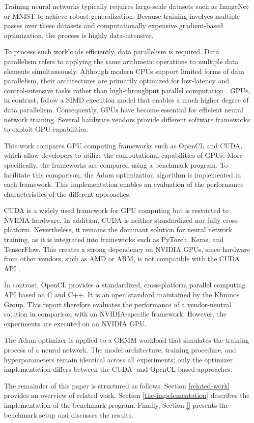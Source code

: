 Training neural networks typically requires large-scale datasets such as
ImageNet or MNIST to achieve robust generalization.
Because training involves multiple passes over these datasets and
computationally expensive gradient-based optimization, the process is highly
data-intensive.

To process such workloads efficiently, data parallelism is required. Data
parallelism refers to applying the same arithmetic operations to multiple data
elements simultaneously. Although modern CPUs support limited forms of data
parallelism, their architectures are primarily optimized for low-latency and
control-intensive tasks rather than high-throughput parallel computation
\cite{kirk2016parallel}. \ac{GPU}s, in contrast, follow a
\ac{SIMD} execution model that enables a much
higher degree of data parallelism. Consequently, GPUs have become essential for
efficient neural network training. Several hardware vendors provide different
software frameworks to exploit GPU capabilities.

This work compares GPU computing frameworks such as OpenCL and CUDA, which allow developers to utilize the computational capabilities of
GPUs. More specifically, the frameworks are compared using a benchmark program. To facilitate this comparison, the Adam optimization
algorithm \cite{kingma2015adam} is implemented in each framework. This implementation enables
an evaluation of the performance characteristics of the different approaches.

CUDA is a widely used framework for GPU computing but is restricted to NVIDIA
hardware. In addition, CUDA is neither standardized nor fully cross-platform.
Nevertheless, it remains the dominant solution for neural network training,
as it is integrated into frameworks such as PyTorch, Keras, and TensorFlow. This creates a strong dependency on NVIDIA GPUs, since hardware from
other vendors, such as AMD or ARM, is not compatible with the CUDA API
\cite{nvidia2024cuda}.

In contrast, OpenCL provides a standardized, cross-platform parallel computing
API based on C and C++. It is an open standard maintained by the Khronos Group. This report therefore evaluates the performance of a vendor-neutral
solution in comparison with an NVIDIA-specific framework. However, the
experiments are executed on an NVIDIA GPU.

The Adam optimizer is applied to a GEMM workload that simulates the training
process of a neural network. The model architecture, training procedure, and
hyperparameters remain identical across all experiments; only the optimizer
implementation differs between the CUDA- and OpenCL-based approaches.

The remainder of this paper is structured as follows. Section
\ref{related-work} provides an overview of related work. Section
\ref{the-impelementation} describes the implementation of the benchmark
program. Finally, Section \ref{} presents the benchmark setup and discusses the
results.